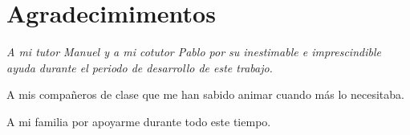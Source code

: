 \pagestyle{plain}
\chapter*{Agradecimimentos}


\begin{center}
{\em
A mi tutor Manuel y a mi cotutor Pablo por su inestimable e imprescindible ayuda durante el periodo de desarrollo de este trabajo.

\bigskip

A mis compañeros de clase que me han sabido animar cuando más lo necesitaba.

\bigskip

A mi familia por apoyarme durante todo este tiempo.

}
\end{center}


